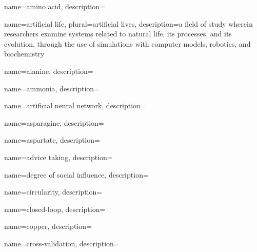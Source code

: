 


	{
		name={amino acid},
		description={}
	}


	{
		name={artificial life},
		plural={artificial lives},
		description={a field of study wherein researchers examine systems related to natural life, its processes, and its evolution, through the use of simulations with computer models, robotics, and biochemistry}
	}
	
	{
		name={alanine},
		description={}
	}	
	
	{
		name={ammonia},
		description={}
	}	
	
	{
		name={artificial neural network},
		description={}
	}		
	
	{
		name={asparagine},
		description={}
	}

	{
		name={aspartate},
		description={}
	}		

	{
		name={advice taking},
		description={}
	}	


	{
		name={degree of social influence},
		description={}
	}


	{
		name={circularity},
		description={}
	}	


	{
		name={closed-loop},
		description={}
	}	

	{
		name={copper},
		description={}
	}

	{
		name={cross-validation},
		description={}
	}		
	

